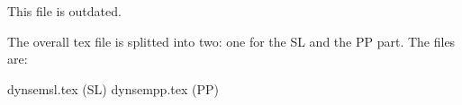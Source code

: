 This file is outdated.

The overall tex file is splitted into two: one for the SL and the PP
part. The files are:
   
      dynsemsl.tex (SL)
      dynsempp.tex (PP)

    